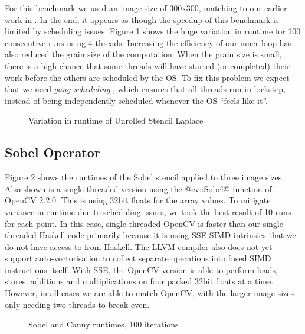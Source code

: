 For this benchmark we used an image size of 300x300, matching to our earlier work in \cite{Keller:repa}. In the end, it appears as though the speedup of this benchmark is limited by scheduling issues. Figure \ref{fig:LaplaceVariation} shows the huge variation in runtime for 100 consecutive runs using 4 threads. Increasing the efficiency of our inner loop has also reduced the grain size of the computation. When the grain size is small, there is a high chance that some threads will have started (or completed) their work before the others are scheduled by the OS. To fix this problem we expect that we need \emph{gang scheduling} \cite{Feitelson:gang-scheduling}, which ensures that all threads run in lockstep, instead of being independently scheduled whenever the OS ``feels like it''. 

\begin{figure}

\caption{Variation in runtime of Unrolled Stencil Laplace}
\label{fig:LaplaceVariation}
\end{figure}



\subsection{Sobel Operator}
Figure \ref{fig:SobelAndCannyRuntime} shows the runtimes of the Sobel stencil applied to three image sizes. Also shown is a single threaded version using the @cv::Sobel@ function of OpenCV 2.2.0. This is using 32bit floats for the array values. To mitigate variance in runtime due to scheduling issues, we took the best result of 10 runs for each point. In this case, single threaded OpenCV is faster than our single threaded Haskell code primarily because it is using SSE SIMD intrinsics that we do not have access to from Haskell. The LLVM compiler also does not yet support auto-vectorisation to collect separate operations into fused SIMD instructions itself. With SSE, the OpenCV version is able to perform loads, stores, additions and multiplications on four packed 32bit floats at a time.  However, in all cases we are able to match OpenCV, with the larger image sizes only needing two threads to break even. 


\begin{figure}


\vspace{0.5ex}
\caption{Sobel and Canny runtimes, 100 iterations}
\label{fig:SobelAndCannyRuntime}
\end{figure}


